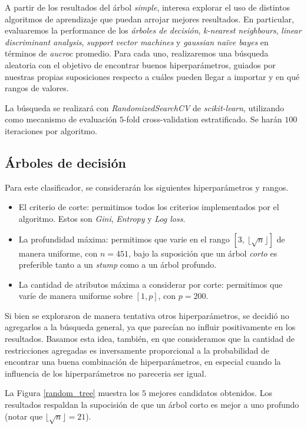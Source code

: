 A partir de los resultados del árbol \textit{simple}, interesa explorar el uso de distintos algoritmos de aprendizaje que puedan arrojar mejores resultados. En particular, evaluaremos la performance de los \textit{árboles de decisión}, \textit{k-nearest neighbours}, \textit{linear discriminant analysis}, \textit{support vector machines} y \textit{gaussian naïve bayes} en términos de \textit{aucroc} promedio. Para cada uno, realizaremos una búsqueda aleatoria con el objetivo de encontrar buenos hiperparámetros, guiados por nuestras propias suposiciones respecto a cuáles pueden llegar a importar y en qué rangos de valores.

La búsqueda se realizará con \textit{RandomizedSearchCV} de \textit{scikit-learn}, utilizando como mecanismo de evaluación $5$-fold cross-validation estratificado. Se harán $100$ iteraciones por algoritmo.

\subsection{Árboles de decisión}
Para este clasificador, se considerarán los siguientes hiperparámetros y rangos. 

\begin{itemize}
    \item El criterio de corte: permitimos todos los criterios implementados por el algoritmo. Estos son \textit{Gini}, \textit{Entropy} y \textit{Log loss}. 
    \item La profundidad máxima: permitimos que varie en el rango $[3,\ \lfloor\sqrt{n} \rfloor]$ de manera uniforme, con $n=451$, bajo la suposición que un árbol \textit{corto} es preferible tanto a un \textit{stump} como a un árbol profundo.
    \item La cantidad de atributos máxima a considerar por corte: permitimos que varíe de manera uniforme sobre $[1, p]$, con $p = 200$.
\end{itemize}

Si bien se exploraron de manera tentativa otros hiperparámetros, se decidió no agregarlos a la búsqueda general, ya que  parecían no influir positivamente en los resultados. Basamos esta idea, también, en que consideramos que la cantidad de restricciones agregadas es inversamente proporcional a la probabilidad de encontrar una buena combinación de hiperparámetros, en especial cuando la influencia de los hiperparámetros no pareceria ser igual. 

La Figura \ref{random_tree} muestra los $5$ mejores candidatos obtenidos. Los resultados respaldan la supocisión de que un árbol corto es mejor a uno profundo (notar que $\lfloor\sqrt{n} \rfloor = 21$).

